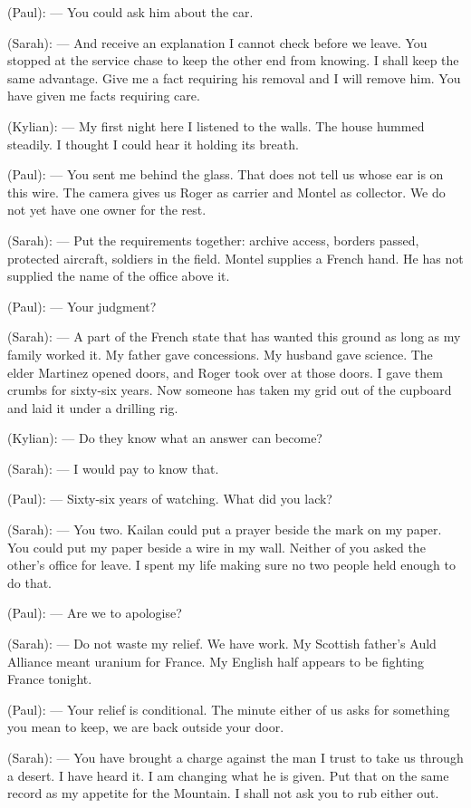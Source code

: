 \begin{room}
(Paul): --- You could ask him about the car.

(Sarah): --- And receive an explanation I cannot check before we leave. You stopped at the service chase to keep the other end from knowing. I shall keep the same advantage. Give me a fact requiring his removal and I will remove him. You have given me facts requiring care.

(Kylian): --- My first night here I listened to the walls. The house hummed steadily. I thought I could hear it holding its breath.

(Paul): --- You sent me behind the glass. That does not tell us whose ear is on this wire. The camera gives us Roger as carrier and Montel as collector. We do not yet have one owner for the rest.

(Sarah): --- Put the requirements together: archive access, borders passed, protected aircraft, soldiers in the field. Montel supplies a French hand. He has not supplied the name of the office above it.

(Paul): --- Your judgment?

(Sarah): --- A part of the French state that has wanted this ground as long as my family worked it. My father gave concessions. My husband gave science. The elder Martinez opened doors, and Roger took over at those doors. I gave them crumbs for sixty-six years. Now someone has taken my grid out of the cupboard and laid it under a drilling rig.

(Kylian): --- Do they know what an answer can become?

(Sarah): --- I would pay to know that.

(Paul): --- Sixty-six years of watching. What did you lack?

(Sarah): --- You two. Kailan could put a prayer beside the mark on my paper. You could put my paper beside a wire in my wall. Neither of you asked the other's office for leave. I spent my life making sure no two people held enough to do that.

(Paul): --- Are we to apologise?

(Sarah): --- Do not waste my relief. We have work. My Scottish father's Auld Alliance meant uranium for France. My English half appears to be fighting France tonight.

(Paul): --- Your relief is conditional. The minute either of us asks for something you mean to keep, we are back outside your door.

(Sarah): --- You have brought a charge against the man I trust to take us through a desert. I have heard it. I am changing what he is given. Put that on the same record as my appetite for the Mountain. I shall not ask you to rub either out.


\end{room}
